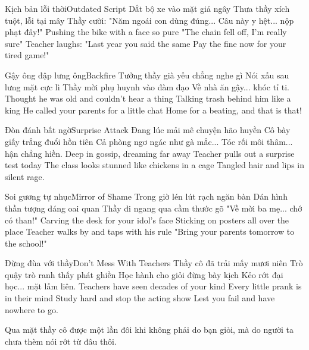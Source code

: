 \begin{tutuyetbox}{Kịch bản lỗi thời}{Outdated Script}
Dắt bộ xe vào mặt giả ngây
Thưa thầy xích tuột, lỗi tại mây
Thầy cười: "Năm ngoái con dùng đúng...
Câu này y hệt... nộp phạt đây!"
\tcblower
Pushing the bike with a face so pure
"The chain fell off, I'm really sure"
Teacher laughs: "Last year you said the same
Pay the fine now for your tired game!"
\end{tutuyetbox}

\begin{tutuyetbox}{Gậy ông đập lưng ông}{Backfire}
Tưởng thầy già yếu chẳng nghe gì
Nói xấu sau lưng mặt cực lì
Thầy mời phụ huynh vào đàm đạo
Về nhà ăn gậy... khóc tỉ ti.
\tcblower
Thought he was old and couldn't hear a thing
Talking trash behind him like a king
He called your parents for a little chat
Home for a beating, and that is that!
\end{tutuyetbox}

\begin{tutuyetbox}{Đòn đánh bất ngờ}{Surprise Attack}
Đang lúc mải mê chuyện hão huyền
Cô bày giấy trắng đuổi hồn tiên
Cả phòng ngơ ngác như gà mắc...
Tóc rối môi thâm... hận chẳng hiền.
\tcblower
Deep in gossip, dreaming far away
Teacher pulls out a surprise test today
The class looks stunned like chickens in a cage
Tangled hair and lips in silent rage.
\end{tutuyetbox}

\begin{tutuyetbox}{Soi gương tự nhục}{Mirror of Shame}
Trong giờ lén lút rạch ngăn bàn
Dán hình thần tượng dáng oai quan
Thầy đi ngang qua cầm thước gõ
"Về mời ba mẹ... chớ có than!"
\tcblower
Carving the desk for your idol's face
Sticking on posters all over the place
Teacher walks by and taps with his rule
"Bring your parents tomorrow to the school!"
\end{tutuyetbox}

\begin{tutuyetbox}{Đừng đùa với thầy}{Don't Mess With Teachers}
Thầy cô đã trải mấy mươi niên
Trò quậy trò ranh thấy phát ghiền
Học hành cho giỏi đừng bày kịch
Kẻo rớt đại học... mặt lấm liên.
\tcblower
Teachers have seen decades of your kind
Every little prank is in their mind
Study hard and stop the acting show
Lest you fail and have nowhere to go.
\end{tutuyetbox}

\begin{ghichu}
Qua mặt thầy cô được một lần đôi khi không phải do bạn giỏi, mà do người ta chưa thèm nói rớt từ đâu thôi.
\end{ghichu}